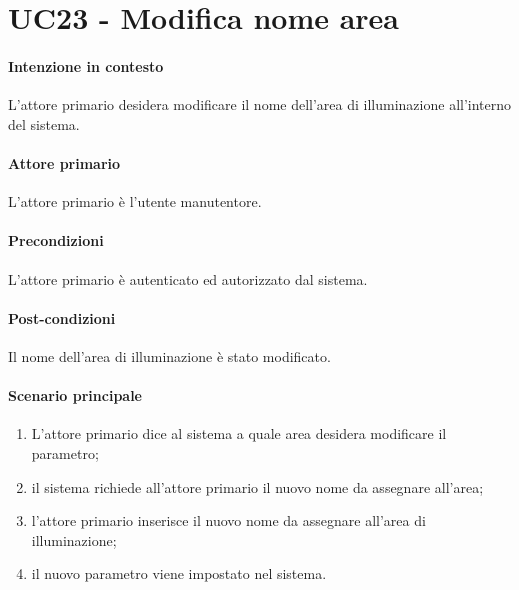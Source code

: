 \section{UC23 - Modifica nome area}\label{uc:23}
\paragraph{Intenzione in contesto} L'attore primario desidera modificare il nome dell'area di illuminazione all'interno del sistema.
\paragraph{Attore primario} L'attore primario è l'utente manutentore.
\paragraph{Precondizioni}  L'attore primario è autenticato ed autorizzato dal sistema.
\paragraph{Post-condizioni} Il nome dell'area di illuminazione è stato modificato.
\paragraph{Scenario principale}
\begin{enumerate}
    \item L'attore primario dice al sistema a quale area desidera modificare il parametro;
    \item il sistema richiede all'attore primario il nuovo nome da assegnare all'area;
    \item l'attore primario inserisce il nuovo nome da assegnare all'area di illuminazione;
    \item il nuovo parametro viene impostato nel sistema.
\end{enumerate}